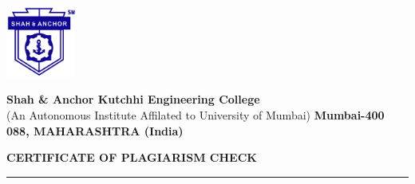\thispagestyle{plain}

\begin{minipage}[c]{1mm}
            \includegraphics[width=23mm]{images/SAKEC_logo.png} %
        \end{minipage}
        \hfill
        \begin{minipage}[c]{126mm} %
            \centering
            { \bf \large {Shah \& Anchor Kutchhi Engineering College  } }\\
   \vspace{-0.01 \baselineskip}
    {(An Autonomous Institute Affilated to University of Mumbai) }
    { \bf \small {Mumbai-400 088, MAHARASHTRA (India)   } }\\
               
            
        \end{minipage}

\vspace{0.2\baselineskip}

\begin{center}
{\Large {\bf \uppercase{CERTIFICATE OF PLAGIARISM CHECK}}}
\end{center}
\vspace{\baselineskip}
\hrule
\vspace{0.1\baselineskip}

